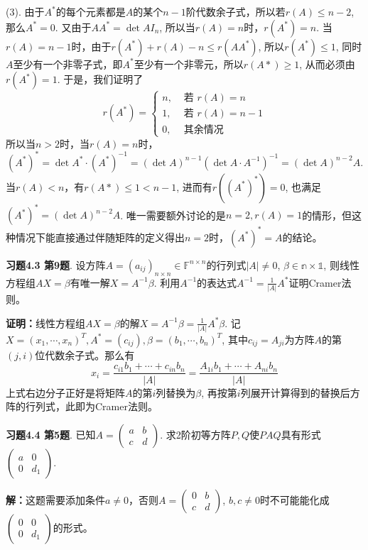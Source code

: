 (3). 由于$A^*$的每个元素都是$A$的某个$n-1$阶代数余子式，所以若$r(A)\leqslant n-2$, 那么$A^* = 0$. 又由于$AA^* = \det A I_n$, 所以当$r(A) = n$时，$r(A^*) = n$. 当$r(A) = n-1$时，由于$r(A^*) + r(A) - n \leqslant r(AA^*)$, 所以$r(A^*) \leqslant 1$, 同时$A$至少有一个非零子式，即$A^*$至少有一个非零元，所以$r(A*) \geqslant 1$, 从而必须由$r(A^*) = 1$. 于是，我们证明了
$$r(A^*) = \begin{cases} n, & \text{ 若 } r(A) = n \\ 1, & \text{ 若 } r(A) = n-1 \\ 0, & \text{ 其余情况} \end{cases}$$
所以当$n > 2$时，当$r(A) = n$时，
$$(A^*)^* = \det A^* \cdot (A^*)^{-1} = (\det A)^{n-1} (\det A \cdot A^{-1})^{-1} = (\det A)^{n-2} A.$$
当$r(A) < n$，有$r(A*) \leqslant 1 < n-1$, 进而有$r((A^*)^*) = 0$, 也满足$(A^*)^* = (\det A)^{n-2}A$. 唯一需要额外讨论的是$n=2, r(A) = 1$的情形，但这种情况下能直接通过伴随矩阵的定义得出$n = 2$时，$(A^*)^* = A$的结论。

\newpageorvspace

{\bf 习题4.3 第9题}. 设方阵$A = (a_{ij})_{n\times n} \in \mathbb{F}^{n\times n}$的行列式$|A| \neq 0$, $\beta\in\mathbb{n\times 1}$, 则线性方程组$AX=\beta$有唯一解$X = A^{-1}\beta$. 利用$A^{-1}$的表达式$A^{-1} = \frac{1}{|A|}A^*$证明Cramer法则。

{\bf 证明：}线性方程组$AX=\beta$的解$X = A^{-1}\beta = \frac{1}{|A|}A^*\beta$. 记$X = (x_1, \cdots, x_n)^T, A^* = (c_{ij}), \beta = (b_1, \cdots, b_n)^T$, 其中$c_{ij} = A_{ji}$为方阵$A$的第$(j,i)$位代数余子式。那么有
$$x_i = \frac{c_{i1}b_1 + \cdots + c_{in}b_n}{|A|} = \frac{A_{1i}b_1 + \cdots + A_{ni}b_n}{|A|}$$
上式右边分子正好是将矩阵$A$的第$i$列替换为$\beta$, 再按第$i$列展开计算得到的替换后方阵的行列式，此即为Cramer法则。

\newpageorvspace

{\bf 习题4.4 第5题}. 已知$A = \begin{pmatrix} a & b \\ c & d \end{pmatrix}$. 求2阶初等方阵$P,Q$使$PAQ$具有形式$\begin{pmatrix} a & 0 \\ 0 & d_1 \end{pmatrix}$.

{\bf 解：}这题需要添加条件$a\neq 0$，否则$A = \begin{pmatrix} 0 & b \\ c & d \end{pmatrix}$, $b,c\neq 0$时不可能能化成$\begin{pmatrix} 0 & 0 \\ 0 & d_1 \end{pmatrix}$的形式。

